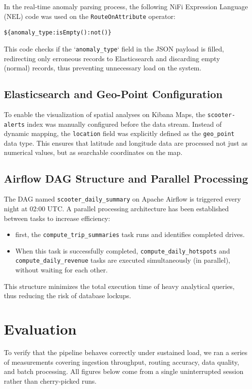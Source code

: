 \documentclass[conference]{IEEEtran}
\begin{document}
In the real-time anomaly parsing process, the following NiFi Expression Language (NEL) code was used on the \texttt{RouteOnAttribute} operator:
\begin{verbatim}
${anomaly_type:isEmpty():not()}
\end{verbatim}
This code checks if the `\texttt{anomaly\_type}` field in the JSON payload is filled, redirecting only erroneous records to Elasticsearch and discarding empty (normal) records, thus preventing unnecessary load on the system.

\subsection{Elasticsearch and Geo-Point Configuration}
To enable the visualization of spatial analyses on Kibana Maps, the \texttt{scooter-alerts} index was manually configured before the data stream. Instead of dynamic mapping, the \texttt{location} field was explicitly defined as the \texttt{geo\_point} data type. This ensures that latitude and longitude data are processed not just as numerical values, but as searchable coordinates on the map.

\subsection{Airflow DAG Structure and Parallel Processing}
The DAG named \texttt{scooter\_daily\_summary} on Apache Airflow is triggered every night at 02:00 UTC. A parallel processing architecture has been established between tasks to increase efficiency:
\begin{itemize}
    \item first, the \texttt{compute\_trip\_summaries} task runs and identifies completed drives.
    \item When this task is successfully completed, \texttt{compute\_daily\_hotspots} and \texttt{compute\_daily\_revenue} tasks are executed simultaneously (in parallel), without waiting for each other.
\end{itemize}
This structure minimizes the total execution time of heavy analytical queries, thus reducing the risk of database lockups.
\section{Evaluation}

To verify that the pipeline behaves correctly under sustained load, we ran a series of measurements covering ingestion throughput, routing accuracy, data quality, and batch processing. All figures below come from a single uninterrupted session rather than cherry-picked runs.
\end{document}
